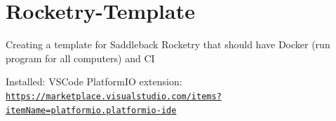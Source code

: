 \chapter{Rocketry-\/\+Template }
\hypertarget{md_README}{}\label{md_README}
\label{md_README_autotoc_md0}%
%


Creating a template for Saddleback Rocketry that should have Docker (run program for all computers) and CI

Installed:\+ VSCode Platform\+IO extension:\+ \href{https://marketplace.visualstudio.com/items?itemName=platformio.platformio-ide}{\texttt{https:\+/\+/\+marketplace.\+visualstudio.\+com/\+items?item\+Name=platformio.\+platformio-\/ide}} 